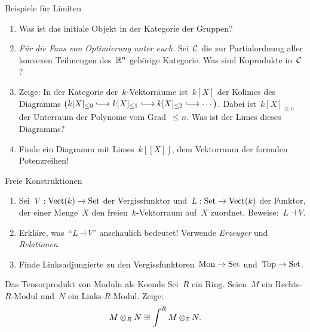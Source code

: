 \documentclass{uebblatt}
\begin{document}

\begin{aufgabe}{Beispiele für Limiten}
\begin{enumerate}
\item Was ist das initiale Objekt in der Kategorie der Gruppen?
\item \emph{Für die Fans von Optimierung unter euch.} Sei~$\mathcal{C}$ die zur
Partialordnung aller konvexen Teilmengen des~$\mathbb{R}^n$ gehörige Kategorie. Was
sind Koprodukte in~$\mathcal{C}$?
\item Zeige: In der Kategorie der~$k$-Vektorräume ist~$k[X]$ der Kolimes des
Diagramms $\bigl(k[X]_{\leq0} \lhra k[X]_{\leq1} \lhra k[X]_{\leq2} \lhra
\cdots \bigr)$. Dabei ist~$k[X]_{\leq n}$ der Unterraum der Polynome vom
Grad~$\leq n$. Was ist der Limes dieses Diagramms?
\item Finde ein Diagramm mit Limes~$k[[X]]$, dem Vektorraum
der formalen Potenzreihen!
\end{enumerate}
\end{aufgabe}

\begin{aufgabe}{Freie Konstruktionen}
\begin{enumerate}
\item Sei~$V : \mathrm{Vect}(k) \to \mathrm{Set}$ der Vergissfunktor und~$L : \mathrm{Set} \to
\mathrm{Vect}(k)$ der Funktor, der einer Menge~$X$ den freien~$k$-Vektorraum
auf~$X$ zuordnet. Beweise:~$L \dashv V$.
\item Erkläre, was~"`$L \dashv V$"' anschaulich bedeutet!
Verwende \emph{Erzeuger} und \emph{Relationen}.
\item Finde Linksadjungierte zu den Vergissfunktoren~$\mathrm{Mon} \to \mathrm{Set}$
und~$\mathrm{Top} \to \mathrm{Set}$.
\end{enumerate}
\end{aufgabe}

\begin{aufgabe}{Das Tensorprodukt von Moduln als Koende}
Sei~$R$ ein Ring. Seien~$M$ ein Rechts-$R$-Modul
und~$N$ ein Links-$R$-Modul. Zeige:
\[ M \otimes_R N \cong \int^R M \otimes_{\mathbb{Z}} N. \]
\vspace{-1.5em}
\end{aufgabe}
\end{document}
